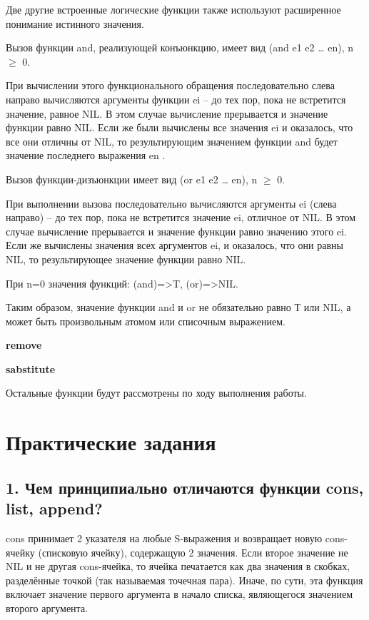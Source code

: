 \documentclass[12pt]{report}
\begin{document}
Две другие встроенные логические функции также используют расширенное понимание истинного значения. 

Вызов функции and, реализующей конъюнкцию, имеет вид (and e1 e2 … en), n $\geqslant$ 0. 

При вычислении этого функционального обращения последовательно слева направо вычисляются аргументы функции ei – до тех пор, пока не  встретится значение, равное NIL. В этом случае вычисление прерывается и значение функции равно NIL. Если же были вычислены все значения ei и  оказалось, что все они отличны от NIL, то результирующим значением функции and будет значение последнего выражения en .

Вызов функции-дизъюнкции имеет вид (or e1 e2 … en), n $\geqslant$ 0. 

При выполнении вызова последовательно вычисляются аргументы ei (слева направо) – до тех пор, пока не встретится значение ei, отличное от NIL. В этом случае вычисление прерывается и значение функции равно значению этого ei. Если же вычислены значения всех аргументов ei, и оказалось, что они равны NIL, то результирующее значение функции равно NIL.

При n=0 значения функций: (and)=>T, (or)=>NIL.

Таким образом, значение функции and и or не обязательно равно Т или NIL, а может быть произвольным атомом или списочным выражением.


\textbf{remove}

\textbf{sabstitute}

Остальные функции будут рассмотрены по ходу выполнения работы.






	
\chapter*{Практические задания}	

\section*{1. Чем принципиально отличаются функции cons, list, append?}

cons принимает 2 указателя на любые S-выражения и возвращает новую cons-ячейку (списковую ячейку), содержащую 2 значения. Если второе значение не NIL и не другая cons-ячейка, то ячейка печатается как два значения в скобках, разделённые точкой (так называемая точечная пара). Иначе, по сути, эта функция включает значение первого аргумента в начало списка, являющегося значением второго аргумента. 
\end{document}
